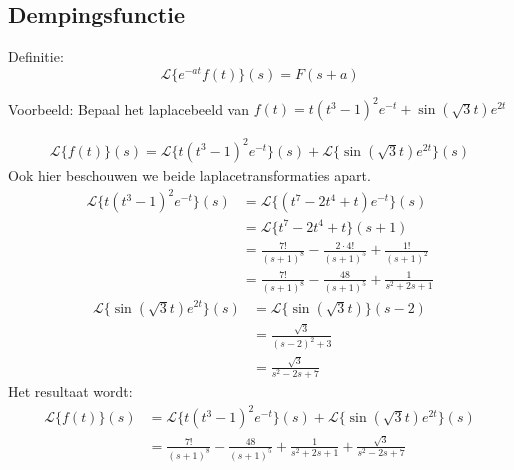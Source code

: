 \documentclass[12pt]{report}
\newcommand{\example}[2]{
    \hrulefill
    
    Voorbeeld: #1
    
    #2
    
    \hrulefill
}
\begin{document}
\subsection{Dempingsfunctie}
Definitie:
$$\mathcal{L}\{e^{-at}f(t)\}(s) = F(s + a)$$
\example{Bepaal het laplacebeeld van $f(t) = t(t^3 - 1)^2e^{-t} + \sin(\sqrt{3}t)e^{2t}$}
{
\begin{equation*}
\begin{split}
\mathcal{L}\{f(t)\}(s) = \mathcal{L}\{t(t^3 - 1)^2e^{-t}\}(s) + \mathcal{L}\{\sin(\sqrt{3}t)e^{2t}\}(s)
\end{split}
\end{equation*}
Ook hier beschouwen we beide laplacetransformaties apart.
\begin{equation*}
\begin{split}
\mathcal{L}\{t(t^3 - 1)^2e^{-t}\}(s) & = \mathcal{L}\{(t^7 - 2t^4 + t)e^{-t}\}(s) \\
                                    & = \mathcal{L}\{t^7 - 2t^4 + t\}(s + 1) \\
                                    & = \frac{7!}{(s + 1)^8} - \frac{2 \cdot 4!}{(s + 1)^5} + \frac{1!}{(s + 1)^2} \\
                                    & = \frac{7!}{(s + 1)^8} - \frac{48}{(s + 1)^5} + \frac{1}{s^2 + 2s + 1}
\end{split}
\end{equation*}
\begin{equation*}
\begin{split}
\mathcal{L}\{\sin(\sqrt{3}t)e^{2t}\}(s) & = \mathcal{L}\{\sin(\sqrt{3}t)\}(s - 2) \\
                                        & = \frac{\sqrt{3}}{(s - 2)^2 + 3} \\
                                        & = \frac{\sqrt{3}}{s^2 -2s + 7}
\end{split}
\end{equation*}
Het resultaat wordt:
\begin{equation*}
\begin{split}
\mathcal{L}\{f(t)\}(s) & = \mathcal{L}\{t(t^3 - 1)^2e^{-t}\}(s) + \mathcal{L}\{\sin(\sqrt{3}t)e^{2t}\}(s) \\
                        & = \frac{7!}{(s + 1)^8} - \frac{48}{(s + 1)^5} + \frac{1}{s^2 + 2s + 1} + \frac{\sqrt{3}}{s^2 -2s + 7}
\end{split}
\end{equation*}
}
\end{document}
